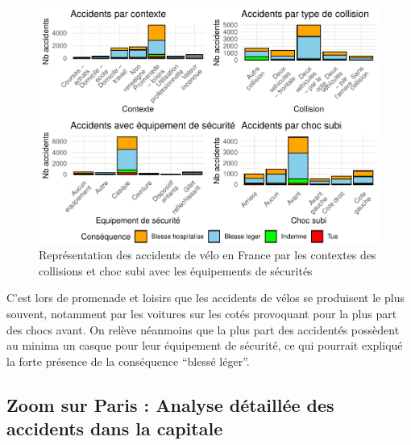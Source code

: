 \documentclass[french,]{compterendu}
\theoremstyle{urcastyle}
\theoremstyle{remark}
\begin{document}
\begin{figure}[H]

{\centering \includegraphics[width=1\linewidth]{Rapport_ADD_LEO-GABET_files/figure-latex/accCONTEXTE-1} 

}

\caption{Représentation des accidents de vélo en France par les contextes des collisions et choc subi avec les équipements de sécurités}\label{fig:accCONTEXTE}
\end{figure}

C'est lors de promenade et loisirs que les accidents de vélos se produisent le plus souvent, notamment par les voitures sur les cotés provoquant pour la plus part des chocs avant. On relève néanmoins que la plus part des accidentés possèdent au minima un casque pour leur équipement de sécurité, ce qui pourrait expliqué la forte présence de la conséquence ``blessé léger''.

\hypertarget{zoom-sur-paris-analyse-duxe9tailluxe9e-des-accidents-dans-la-capitale}{%
\subsection{Zoom sur Paris : Analyse détaillée des accidents dans la capitale}\label{zoom-sur-paris-analyse-duxe9tailluxe9e-des-accidents-dans-la-capitale}}
\end{document}
